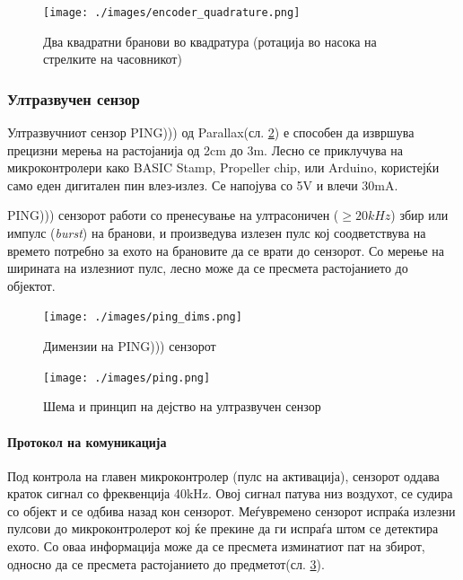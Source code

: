 \documentclass[11pt]{article}
\begin{document}
      \begin{figure}[H]
        \texttt{[image: ./images/encoder\_quadrature.png]}
        \centering
        \caption{Два квадратни бранови во квадратура (ротација во насока на стрелките на часовникот)}
        \label{fig:encoder_quadrature}
        \end{figure}


    \subsubsection{Ултразвучен сензор}
      Ултразвучниот сензор PING))) од Parallax(сл. \ref{fig:ping_dims}) е способен да извршува прецизни мерења на растојанија од 2cm до 3m. Лесно се приклучува на микроконтролери како BASIC Stamp, Propeller chip, или Arduino, користејќи само еден дигитален пин влез-излез. Се напојува со 5V и влечи 30mA.

		  PING))) сензорот работи со пренесување на ултрасоничен ($\geq 20kHz$) збир или импулс (\textit{burst}) на бранови, и произведува излезен пулс кој соодветствува на времето потребно за ехото на брановите да се врати до сензорот. Со мерење на ширината на излезниот пулс, лесно може да се пресмета растојанието до објектот.

		  \begin{figure}[h]
        \texttt{[image: ./images/ping\_dims.png]}
        \centering
        \caption{Димензии на PING))) сензорот}
        \label{fig:ping_dims}
        \end{figure}

      \begin{figure}[h]
        \texttt{[image: ./images/ping.png]}
        \centering
        \caption{Шема и принцип на дејство на ултразвучен сензор}
        \label{fig:ping.png}
        \end{figure}

		  \paragraph{Протокол на комуникација\\}
        Под контрола на главен микроконтролер (пулс на активација), сензорот оддава краток сигнал со фреквенција 40kHz. Овој сигнал патува низ воздухот, се судира со објект и се одбива назад кон сензорот. Меѓувремено сензорот испраќа излезни пулсови до микроконтролерот кој ќе прекине да ги испраѓа штом се детектира ехото. Со оваа информација може да се пресмета изминатиот пат на збирот, односно да се пресмета растојанието до предметот(сл. \ref{fig:ping.png}).
\end{document}
